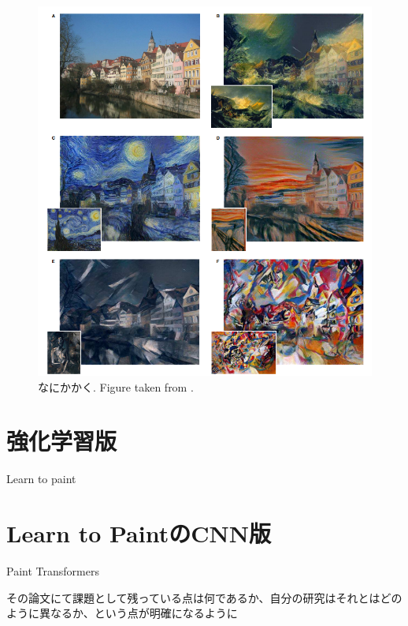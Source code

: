 \begin{figure}
    \centering
    \includegraphics[width=150truemm]{resources/3_related_work/outputs_IST.png}
    \caption{
      なにかかく. Figure taken from
      \cite{Gatys_2016_CVPR}. 
    }
    \label{output_IST}
\end{figure}


\section{強化学習版}
Learn to paint \cite{Huang_2019_ICCV}
\section{Learn to PaintのCNN版}
Paint Transformers \cite{liu2021paint}

その論文にて課題として残っている点は何であるか、自分の研究はそれとはどのように異なるか、という点が明確になるように